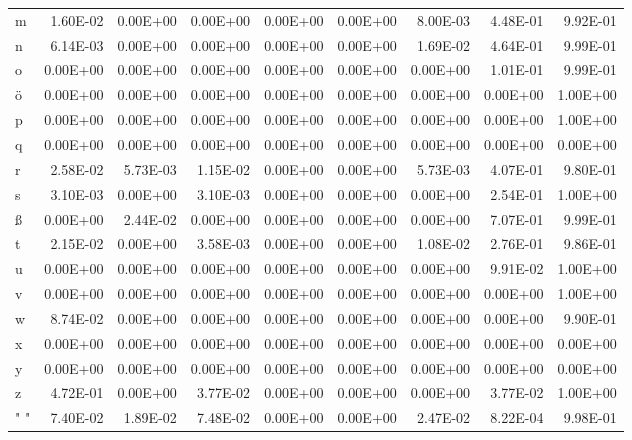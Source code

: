 \documentclass[11pt,a4paper]{CLabBookTemplate} %
\begin{document}
\begin{table}[htbp]
\begin{tabular}{lrrrrrrrr}
		m     & 1.60E-02 & 0.00E+00 & 0.00E+00 & 0.00E+00 & 0.00E+00 & 8.00E-03 & 4.48E-01 & 9.92E-01 \\
		n     & 6.14E-03 & 0.00E+00 & 0.00E+00 & 0.00E+00 & 0.00E+00 & 1.69E-02 & 4.64E-01 & 9.99E-01 \\
		o     & 0.00E+00 & 0.00E+00 & 0.00E+00 & 0.00E+00 & 0.00E+00 & 0.00E+00 & 1.01E-01 & 9.99E-01 \\
		ö     & 0.00E+00 & 0.00E+00 & 0.00E+00 & 0.00E+00 & 0.00E+00 & 0.00E+00 & 0.00E+00 & 1.00E+00 \\
		p     & 0.00E+00 & 0.00E+00 & 0.00E+00 & 0.00E+00 & 0.00E+00 & 0.00E+00 & 0.00E+00 & 1.00E+00 \\
		q     & 0.00E+00 & 0.00E+00 & 0.00E+00 & 0.00E+00 & 0.00E+00 & 0.00E+00 & 0.00E+00 & 0.00E+00 \\
		r     & 2.58E-02 & 5.73E-03 & 1.15E-02 & 0.00E+00 & 0.00E+00 & 5.73E-03 & 4.07E-01 & 9.80E-01 \\
		s     & 3.10E-03 & 0.00E+00 & 3.10E-03 & 0.00E+00 & 0.00E+00 & 0.00E+00 & 2.54E-01 & 1.00E+00 \\
		ß     & 0.00E+00 & 2.44E-02 & 0.00E+00 & 0.00E+00 & 0.00E+00 & 0.00E+00 & 7.07E-01 & 9.99E-01 \\
		t     & 2.15E-02 & 0.00E+00 & 3.58E-03 & 0.00E+00 & 0.00E+00 & 1.08E-02 & 2.76E-01 & 9.86E-01 \\
		u     & 0.00E+00 & 0.00E+00 & 0.00E+00 & 0.00E+00 & 0.00E+00 & 0.00E+00 & 9.91E-02 & 1.00E+00 \\
		v     & 0.00E+00 & 0.00E+00 & 0.00E+00 & 0.00E+00 & 0.00E+00 & 0.00E+00 & 0.00E+00 & 1.00E+00 \\
		w     & 8.74E-02 & 0.00E+00 & 0.00E+00 & 0.00E+00 & 0.00E+00 & 0.00E+00 & 0.00E+00 & 9.90E-01 \\
		x     & 0.00E+00 & 0.00E+00 & 0.00E+00 & 0.00E+00 & 0.00E+00 & 0.00E+00 & 0.00E+00 & 0.00E+00 \\
		y     & 0.00E+00 & 0.00E+00 & 0.00E+00 & 0.00E+00 & 0.00E+00 & 0.00E+00 & 0.00E+00 & 0.00E+00 \\
		z     & 4.72E-01 & 0.00E+00 & 3.77E-02 & 0.00E+00 & 0.00E+00 & 0.00E+00 & 3.77E-02 & 1.00E+00 \\
		" "   & 7.40E-02 & 1.89E-02 & 7.48E-02 & 0.00E+00 & 0.00E+00 & 2.47E-02 & 8.22E-04 & 9.98E-01 \\
	\end{tabular}%
	\label{tab:ProbTrans4}%
\end{table}%

\clearpage
\newpage
\end{document}
